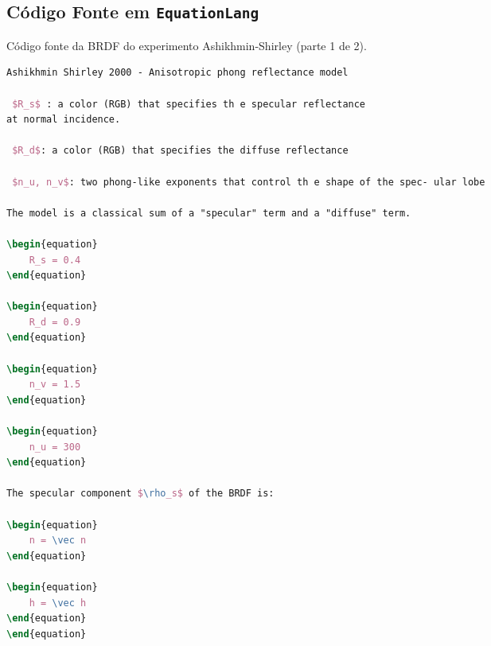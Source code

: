 \subsection{Código Fonte em \texttt{EquationLang}}
\begin{codigo}[H]
    \caption{\small Código fonte da BRDF do experimento Ashikhmin-Shirley (parte 1 de 2).}
    \label{cod-ashikhmin-shirley-close-to-original-eqlang-pt-1}
\begin{lstlisting}[language=tex, frame=none, inputencoding=utf8]
Ashikhmin Shirley 2000 - Anisotropic phong reflectance model

 $R_s$ : a color (RGB) that specifies th e specular reflectance
at normal incidence.

 $R_d$: a color (RGB) that specifies the diffuse reflectance

 $n_u, n_v$: two phong-like exponents that control th e shape of the spec- ular lobe

The model is a classical sum of a "specular" term and a "diffuse" term.

\begin{equation}
    R_s = 0.4
\end{equation}

\begin{equation}
    R_d = 0.9
\end{equation}

\begin{equation}
    n_v = 1.5
\end{equation}

\begin{equation}
    n_u = 300
\end{equation}

The specular component $\rho_s$ of the BRDF is:

\begin{equation}
    n = \vec n
\end{equation}

\begin{equation}
    h = \vec h
\end{equation}
\end{equation}
\end{lstlisting}
\end{codigo}



